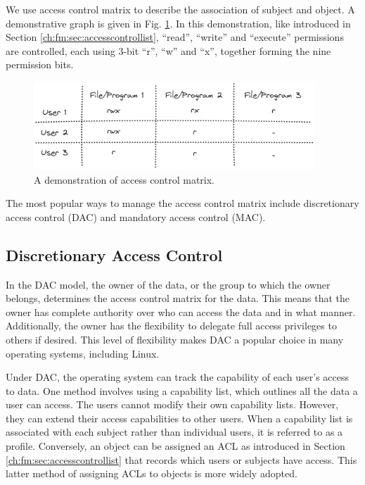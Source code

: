 We use access control matrix to describe the association of subject and object. A demonstrative graph is given in Fig. \ref{ch:ossec:fig:acmatrix}. In this demonstration, like introduced in Section \ref{ch:fm:sec:accesscontrollist}, ``read'', ``write'' and ``execute'' permissions are controlled, each using $3$-bit ``r'', ``w'' and ``x'', together forming the nine permission bits.
\begin{figure}[htbp]
	\centering
	\includegraphics[width=300pt]{chapters/ch-computer-security-basics/figures/acmatrix.png}
	\caption{A demonstration of access control matrix.} \label{ch:ossec:fig:acmatrix}
\end{figure}

The most popular ways to manage the access control matrix include discretionary access control (DAC) and mandatory access control (MAC).

\subsection{Discretionary Access Control}

In the DAC model, the owner of the data, or the group to which the owner belongs, determines the access control matrix for the data. This means that the owner has complete authority over who can access the data and in what manner. Additionally, the owner has the flexibility to delegate full access privileges to others if desired. This level of flexibility makes DAC a popular choice in many operating systems, including Linux.

Under DAC, the operating system can track the capability of each user's access to data. One method involves using a capability list, which outlines all the data a user can access. The users cannot modify their own capability lists. However, they can extend their access capabilities to other users. When a capability list is associated with each subject rather than individual users, it is referred to as a profile. Conversely, an object can be assigned an ACL as introduced in Section \ref{ch:fm:sec:accesscontrollist} that records which users or subjects have access. This latter method of assigning ACLs to objects is more widely adopted.

